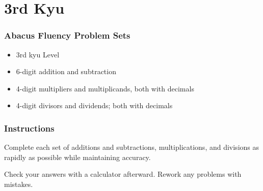 \hypertarget{rd-kyu}{%
\section{3rd Kyu}\label{rd-kyu}}

\hypertarget{abacus-fluency-problem-sets}{%
\subsubsection{Abacus Fluency Problem
Sets}\label{abacus-fluency-problem-sets}}

\begin{itemize}
\item
  3rd kyu Level
\item
  6-digit addition and subtraction
\item
  4-digit multipliers and multiplicands, both with decimals
\item
  4-digit divisors and dividends; both with decimals
\end{itemize}

\hypertarget{instructions}{%
\subsubsection{Instructions}\label{instructions}}

Complete each set of additions and subtractions, multiplications, and
divisions as rapidly as possible while maintaining accuracy.

Check your answers with a calculator afterward. Rework any problems with
mistakes.
